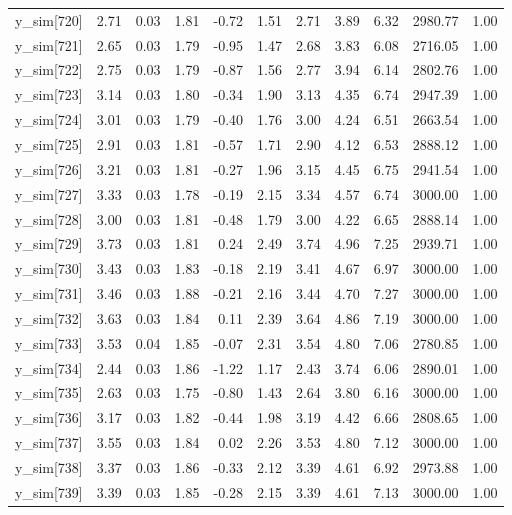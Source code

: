 \begin{table}[ht]
\begin{tabular}{rrrrrrrrrrr}
  y\_sim[720] & 2.71 & 0.03 & 1.81 & -0.72 & 1.51 & 2.71 & 3.89 & 6.32 & 2980.77 & 1.00 \\ 
  y\_sim[721] & 2.65 & 0.03 & 1.79 & -0.95 & 1.47 & 2.68 & 3.83 & 6.08 & 2716.05 & 1.00 \\ 
  y\_sim[722] & 2.75 & 0.03 & 1.79 & -0.87 & 1.56 & 2.77 & 3.94 & 6.14 & 2802.76 & 1.00 \\ 
  y\_sim[723] & 3.14 & 0.03 & 1.80 & -0.34 & 1.90 & 3.13 & 4.35 & 6.74 & 2947.39 & 1.00 \\ 
  y\_sim[724] & 3.01 & 0.03 & 1.79 & -0.40 & 1.76 & 3.00 & 4.24 & 6.51 & 2663.54 & 1.00 \\ 
  y\_sim[725] & 2.91 & 0.03 & 1.81 & -0.57 & 1.71 & 2.90 & 4.12 & 6.53 & 2888.12 & 1.00 \\ 
  y\_sim[726] & 3.21 & 0.03 & 1.81 & -0.27 & 1.96 & 3.15 & 4.45 & 6.75 & 2941.54 & 1.00 \\ 
  y\_sim[727] & 3.33 & 0.03 & 1.78 & -0.19 & 2.15 & 3.34 & 4.57 & 6.74 & 3000.00 & 1.00 \\ 
  y\_sim[728] & 3.00 & 0.03 & 1.81 & -0.48 & 1.79 & 3.00 & 4.22 & 6.65 & 2888.14 & 1.00 \\ 
  y\_sim[729] & 3.73 & 0.03 & 1.81 & 0.24 & 2.49 & 3.74 & 4.96 & 7.25 & 2939.71 & 1.00 \\ 
  y\_sim[730] & 3.43 & 0.03 & 1.83 & -0.18 & 2.19 & 3.41 & 4.67 & 6.97 & 3000.00 & 1.00 \\ 
  y\_sim[731] & 3.46 & 0.03 & 1.88 & -0.21 & 2.16 & 3.44 & 4.70 & 7.27 & 3000.00 & 1.00 \\ 
  y\_sim[732] & 3.63 & 0.03 & 1.84 & 0.11 & 2.39 & 3.64 & 4.86 & 7.19 & 3000.00 & 1.00 \\ 
  y\_sim[733] & 3.53 & 0.04 & 1.85 & -0.07 & 2.31 & 3.54 & 4.80 & 7.06 & 2780.85 & 1.00 \\ 
  y\_sim[734] & 2.44 & 0.03 & 1.86 & -1.22 & 1.17 & 2.43 & 3.74 & 6.06 & 2890.01 & 1.00 \\ 
  y\_sim[735] & 2.63 & 0.03 & 1.75 & -0.80 & 1.43 & 2.64 & 3.80 & 6.16 & 3000.00 & 1.00 \\ 
  y\_sim[736] & 3.17 & 0.03 & 1.82 & -0.44 & 1.98 & 3.19 & 4.42 & 6.66 & 2808.65 & 1.00 \\ 
  y\_sim[737] & 3.55 & 0.03 & 1.84 & 0.02 & 2.26 & 3.53 & 4.80 & 7.12 & 3000.00 & 1.00 \\ 
  y\_sim[738] & 3.37 & 0.03 & 1.86 & -0.33 & 2.12 & 3.39 & 4.61 & 6.92 & 2973.88 & 1.00 \\ 
  y\_sim[739] & 3.39 & 0.03 & 1.85 & -0.28 & 2.15 & 3.39 & 4.61 & 7.13 & 3000.00 & 1.00 \\ 

\end{tabular}
\end{table}
